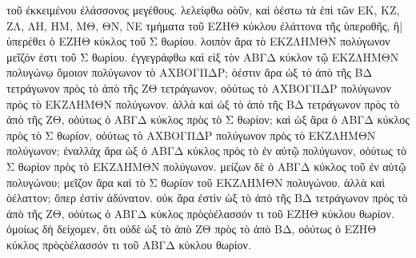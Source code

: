 \begin{Parallel}{}{}
{{τοῦ ἐκκειμένου ἐλάσσονος μεγέθους. λελείφθω οὸῦν, καὶ ὸέστω τὰ ἐπὶ
τῶν ΕΚ, ΚΖ, ΖΛ, ΛΗ, ΗΜ, ΜΘ, ΘΝ, ΝΕ τμήματα τοῦ ΕΖΗΘ κύκλου ἐλάττονα
τῆς ὑπεροθῆς, ἣ| ὑπερέθει ὁ ΕΖΗΘ κύκλος τοῦ Σ θωρίου. λοιπὸν ἄρα τὸ ΕΚΖΛΗΜΘΝ πολύγωνον
μεῖζόν ἐστι τοῦ Σ θωρίου.
 ἐγγεγράφθω καὶ εἰξ τὸν ΑΒΓΔ κύκλον τῷ ΕΚΖΛΗΜΘΝ
πολυγώνῳ ὅμοιον πολύγωνον τὸ ΑΧΒΟΓΠΔΡ; ὸέστιν ἄρα ὡξ τὸ ἀπὸ
τῆς ΒΔ τετράγωνον πρὸς τὸ ἀπὸ τῆς ΖΘ τετράγωνον, οὁύτως τὸ
ΑΧΒΟΓΠΔΡ πολύγωνον πρὸς τὸ ΕΚΖΛΗΜΘΝ πολύγωνον. ἀλλὰ καὶ ὡξ  τὸ ἀπὸ τῆς ΒΔ τετράγωνον πρὸς τὸ ἀπὸ τῆς
ΖΘ, οὁύτως ὁ ΑΒΓΔ κύκλος πρὸς τὸ Σ θωρίον; καὶ ὡξ ἄρα ὁ ΑΒΓΔ κύκλος
πρὸς τὸ Σ θωρίον, οὁύτως τὸ ΑΧΒΟΓΠΔΡ πολύγωνον πρὸς τὸ ΕΚΖΛΗΜΘΝ
πολύγωνον; ἐναλλὰχ ἄρα ὡξ ὁ ΑΒΓΔ κύκλος πρὸς τὸ ἐν αὐτῷ πολύγωνον, οὁύτως τὸ Σ θωρίον πρὸς τὸ ΕΚΖΛΗΜΘΝ πολύγωνον.  μείζων δὲ ὁ ΑΒΓΔ κύκλος τοῦ ἐν αὐτῷ πολυγώνου; μεῖζον ἄρα καὶ τὸ Σ θωρίον τοῦ ΕΚΖΛΗΜΘΝ πολυγώνου. ἀλλὰ
καὶ ὸέλαττον; ὅπερ ἐστὶν ἀδύνατον. οὐκ ἄρα ἐστὶν ὡξ τὸ ἀπὸ τῆς ΒΔ τετράγωνον πρὸς τὸ ἀπὸ τῆς ΖΘ, οὁύτως ὁ ΑΒΓΔ κύκλος πρὸςὸέλασσόν τι τοῦ ΕΖΗΘ κύκλου θωρίον. ὁμοίως δὴ δείχομεν, ὅτι οὐδὲ ὡξ τὸ ἀπὸ ΖΘ πρὸς
τὸ ἀπὸ ΒΔ, οὁύτως ὁ ΕΖΗΘ κύκλος πρὸςὸέλασσόν τι τοῦ ΑΒΓΔ κύκλου θωρίον.}



}

\end{Parallel}
